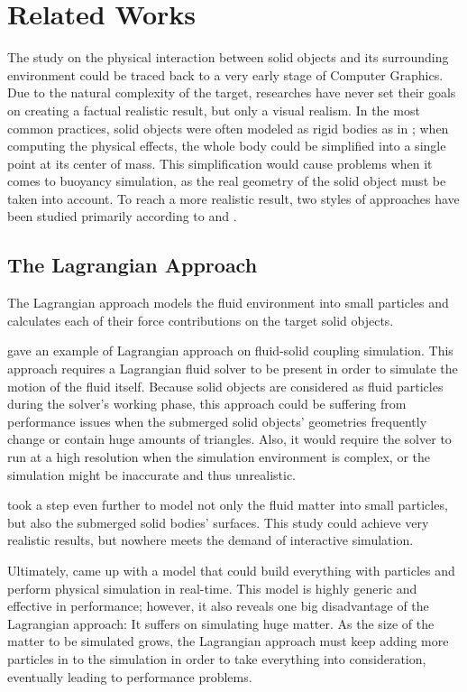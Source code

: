 \section{Related Works}

The study on the physical interaction between solid objects and its surrounding environment could be traced back to a very early stage of Computer Graphics.
Due to the natural complexity of the target, researches have never set their goals on creating a factual realistic result, but only a visual realism.
In the most common practices, solid objects were often modeled as rigid bodies as in \cite{BAR01}; when computing the physical effects, the whole body could be simplified into a single point at its center of mass.
This simplification would cause problems when it comes to buoyancy simulation, as the real geometry of the solid object must be taken into account.
To reach a more realistic result, two styles of approaches have been studied primarily according to \cite{GOU09} and \cite{wang2024physics}.

\subsection{The Lagrangian Approach}

The Lagrangian approach models the fluid environment into small particles and calculates each of their force contributions on the target solid objects.

\cite{CAR04} gave an example of Lagrangian approach on fluid-solid coupling simulation.
This approach requires a Lagrangian fluid solver to be present in order to simulate the motion of the fluid itself.
Because solid objects are considered as fluid particles during the solver's working phase, this approach could be suffering from performance issues when the submerged solid objects' geometries frequently change or contain huge amounts of triangles.
Also, it would require the solver to run at a high resolution when the simulation environment is complex, or the simulation might be inaccurate and thus unrealistic.

\cite{AKI12} took a step even further to model not only the fluid matter into small particles, but also the submerged solid bodies' surfaces.
This study could achieve very realistic results, but nowhere meets the demand of interactive simulation.

Ultimately, \cite{macklin2014unified} came up with a model that could build everything with particles and perform physical simulation in real-time.
This model is highly generic and effective in performance;
however, it also reveals one big disadvantage of the Lagrangian approach:
It suffers on simulating huge matter.
As the size of the matter to be simulated grows, the Lagrangian approach must keep adding more particles in to the simulation in order to take everything into consideration, eventually leading to performance problems.

